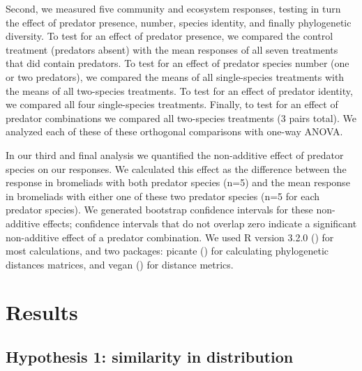 \documentclass[11pt]{article}
\begin{document}
Second, we measured five community and ecosystem responses, testing in
turn the effect of predator presence, number, species identity, and
finally phylogenetic diversity. To test for an effect of predator
presence, we compared the control treatment (predators absent) with the
mean responses of all seven treatments that did contain predators. To
test for an effect of predator species number (one or two predators), we
compared the means of all single-species treatments with the means of
all two-species treatments. To test for an effect of predator identity,
we compared all four single-species treatments. Finally, to test for an
effect of predator combinations we compared all two-species treatments
(3 pairs total). We analyzed each of these of these orthogonal
comparisons with one-way ANOVA.

In our third and final analysis we quantified the non-additive effect of
predator species on our responses. We calculated this effect as the
difference between the response in bromeliads with both predator species
(n=5) and the mean response in bromeliads with either one of these two
predator species (n=5 for each predator species). We generated bootstrap
confidence intervals for these non-additive effects; confidence
intervals that do not overlap zero indicate a significant non-additive
effect of a predator combination. We used R version 3.2.0 (\citealt{rcore})
for most calculations, and two packages: picante (\citealt{picante}) for
calculating phylogenetic distances matrices, and vegan (\citealt{vegan}) for
distance metrics.

\section*{Results}

\subsection*{Hypothesis 1: similarity in distribution}
\end{document}
